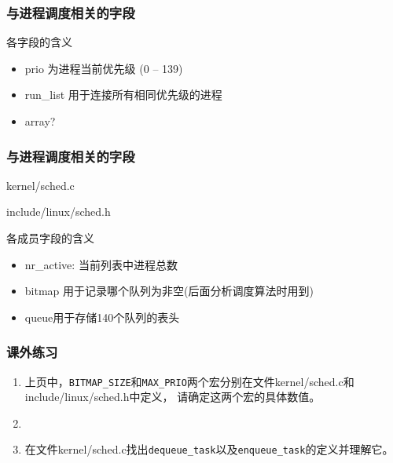 \documentclass[xcolor=svgnames]{beamer}
\begin{document}
\begin{CJK*}{UTF8}{gbsn}
\begin{frame}%
\frametitle{与进程调度相关的字段}
\lstrunning
\begin{block}{各字段的含义}
\begin{itemize}
\item prio 为进程当前优先级 (0 -- 139)
\item run\_list 用于连接所有相同优先级的进程
\item array?
\end{itemize}
\end{block}
\end{frame}

\begin{frame}%
\frametitle{与进程调度相关的字段}
\begin{block}{kernel/sched.c}
\lstprio
\end{block}
\begin{block}{include/linux/sched.h}
\lstprioarrayt
\end{block}
\begin{block}{各成员字段的含义}
\begin{itemize}
\item nr\_active: 当前列表中进程总数
\item bitmap 用于记录哪个队列为非空(后面分析调度算法时用到)
\item queue用于存储140个队列的表头
\end{itemize}
\end{block}
\end{frame}

\begin{frame}[fragile]
\frametitle{课外练习}
\begin{enumerate}
\item 上页中，\verb|BITMAP_SIZE|和\verb|MAX_PRIO|两个宏分别在文件kernel/sched.c和include/linux/sched.h中定义，
请确定这两个宏的具体数值。
\item[]
\item 在文件kernel/sched.c找出\verb|dequeue_task|以及\verb|enqueue_task|的定义并理解它。
\end{enumerate}
\end{frame}


\end{CJK*}
\end{document}
